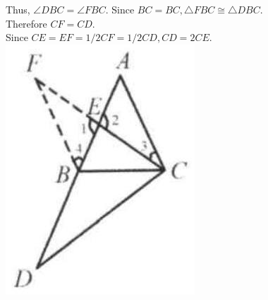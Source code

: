 \documentclass[10pt]{article}
\begin{document}
Thus, \(\angle D B C=\angle F B C\). Since \(B C=B C, \triangle F B C \cong \triangle D B C\).\\
Therefore \(C F=C D\).\\
Since \(C E=E F=1 / 2 C F=1 / 2 C D, C D=2 C E\).\\
\includegraphics[max width=\textwidth, center]{2025_04_17_97bc1f7e44d93c271a88g-030}
\end{document}
